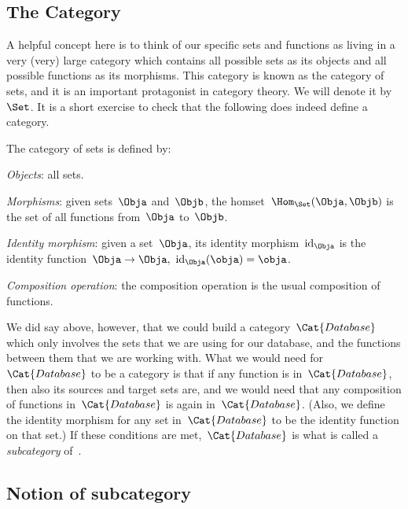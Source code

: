 \subsection{The Category \Set}

A helpful concept here is to think of our specific sets and functions as living in a very (very) large category which contains all possible sets as its objects and all possible functions as its morphisms. This category is known as the category of sets, and it is an important protagonist in category theory. We will denote it by $\Set$. It is a short exercise to check that the following does indeed define a category.

\begin{ctdefinition}
The category of sets \Set is defined by:
    \begin{compactenum}
    \item \emph{Objects}: all sets.
    \item \emph{Morphisms}: given sets~$\Obja$ and~$\Objb$, the homset~$\Hom_\Set(\Obja,\Objb)$ is the set of all functions from~$\Obja$ to~$\Objb$.
    \item \emph{Identity morphism}: given a set~$\Obja$, its identity morphism~$\text{id}_\Obja$ is the identity function~$\Obja \to \Obja, \ \text{id}_\Obja(\obja) = \obja$.
    \item \emph{Composition operation}: the composition operation is the usual composition of functions.
    \end{compactenum}
\end{ctdefinition} 

We did say above, however, that we could build a category~$\Cat{Database}$ which only involves the sets that we are using for our database, and the functions between them that we are working with. What we would need for~$\Cat{Database}$ to be a category is that if any function is in~$\Cat{Database}$, then also its sources and target sets are, and we would need that any composition of functions in~$\Cat{Database}$ is again in~$\Cat{Database}$. (Also, we define the identity morphism for any set in~$\Cat{Database}$ to be the identity function on that set.) If these conditions are met,~$\Cat{Database}$ is what is called a \emph{subcategory} of~\Set. 


\subsection{Notion of subcategory}
 
